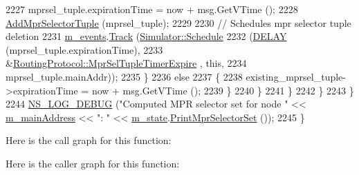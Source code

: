 \begin{DoxyCode}
2227                       mprsel\_tuple.expirationTime = now + msg.GetVTime ();
2228                       \hyperlink{classns3_1_1olsr_1_1RoutingProtocol_aff14042e35d2343b080522580f3d5b24}{AddMprSelectorTuple} (mprsel\_tuple);
2229 
2230                       \textcolor{comment}{// Schedules mpr selector tuple deletion}
2231                       \hyperlink{classns3_1_1olsr_1_1RoutingProtocol_a80368d3da46150cf3fc9139c40f33d53}{m\_events}.\hyperlink{classns3_1_1EventGarbageCollector_a4f26a1f6e9a09e648eb31b46acd85144}{Track} (\hyperlink{classns3_1_1Simulator_a671882c894a08af4a5e91181bf1eec13}{Simulator::Schedule}
2232                                         (\hyperlink{olsr-routing-protocol_8cc_ad0a00c3386c4a24278b3b710ae798220}{DELAY} (mprsel\_tuple.expirationTime),
2233                                         &\hyperlink{classns3_1_1olsr_1_1RoutingProtocol_a47272f0889e3c50e4fe26f1f4d9fb3fe}{RoutingProtocol::MprSelTupleTimerExpire}
      , \textcolor{keyword}{this},
2234                                         mprsel\_tuple.mainAddr));
2235                     \}
2236                   \textcolor{keywordflow}{else}
2237                     \{
2238                       existing\_mprsel\_tuple->expirationTime = now + msg.GetVTime ();
2239                     \}
2240                 \}
2241             \}
2242         \}
2243     \}
2244   \hyperlink{group__logging_ga413f1886406d49f59a6a0a89b77b4d0a}{NS\_LOG\_DEBUG} (\textcolor{stringliteral}{"Computed MPR selector set for node "} << 
      \hyperlink{classns3_1_1olsr_1_1RoutingProtocol_a58cc50ed5d1039aab603e90e318aabfb}{m\_mainAddress} << \textcolor{stringliteral}{": "} << \hyperlink{classns3_1_1olsr_1_1RoutingProtocol_a07942ec1a7df71b609c8d2ff3b567c49}{m\_state}.\hyperlink{classns3_1_1olsr_1_1OlsrState_a54a82f932deb7904e5ec0ffcdd70c8a9}{PrintMprSelectorSet} ());
2245 \}
\end{DoxyCode}


Here is the call graph for this function\+:




Here is the caller graph for this function\+:


